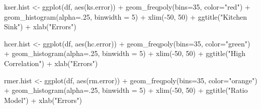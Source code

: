 \documentclass[
]{article}
\newenvironment{Shaded}{\begin{snugshade}}{\end{snugshade}}
\newcommand{\AttributeTok}[1]{\textcolor[rgb]{0.77,0.63,0.00}{#1}}
\newcommand{\DecValTok}[1]{\textcolor[rgb]{0.00,0.00,0.81}{#1}}
\newcommand{\FunctionTok}[1]{\textcolor[rgb]{0.00,0.00,0.00}{#1}}
\newcommand{\NormalTok}[1]{#1}
\newcommand{\OtherTok}[1]{\textcolor[rgb]{0.56,0.35,0.01}{#1}}
\newcommand{\SpecialCharTok}[1]{\textcolor[rgb]{0.00,0.00,0.00}{#1}}
\newcommand{\StringTok}[1]{\textcolor[rgb]{0.31,0.60,0.02}{#1}}
\begin{document}
\begin{Shaded}
\begin{Highlighting}[]
\NormalTok{kser.hist }\OtherTok{\textless{}{-}} \FunctionTok{ggplot}\NormalTok{(df, }\FunctionTok{aes}\NormalTok{(ks.error)) }\SpecialCharTok{+} 
  \FunctionTok{geom\_freqpoly}\NormalTok{(}\AttributeTok{bins=}\DecValTok{35}\NormalTok{, }\AttributeTok{color=}\StringTok{"red"}\NormalTok{) }\SpecialCharTok{+} 
  \FunctionTok{geom\_histogram}\NormalTok{(}\AttributeTok{alpha=}\NormalTok{.}\DecValTok{25}\NormalTok{, }\AttributeTok{binwidth =} \DecValTok{5}\NormalTok{)  }\SpecialCharTok{+} 
  \FunctionTok{xlim}\NormalTok{(}\SpecialCharTok{{-}}\DecValTok{50}\NormalTok{, }\DecValTok{50}\NormalTok{) }\SpecialCharTok{+} 
  \FunctionTok{ggtitle}\NormalTok{(}\StringTok{"Kitchen Sink"}\NormalTok{) }\SpecialCharTok{+} 
  \FunctionTok{xlab}\NormalTok{(}\StringTok{"Errors"}\NormalTok{)}

\NormalTok{hcer.hist }\OtherTok{\textless{}{-}} \FunctionTok{ggplot}\NormalTok{(df, }\FunctionTok{aes}\NormalTok{(hc.error)) }\SpecialCharTok{+} 
  \FunctionTok{geom\_freqpoly}\NormalTok{(}\AttributeTok{bins=}\DecValTok{35}\NormalTok{, }\AttributeTok{color=}\StringTok{"green"}\NormalTok{) }\SpecialCharTok{+} 
  \FunctionTok{geom\_histogram}\NormalTok{(}\AttributeTok{alpha=}\NormalTok{.}\DecValTok{25}\NormalTok{, }\AttributeTok{binwidth =} \DecValTok{5}\NormalTok{) }\SpecialCharTok{+} 
  \FunctionTok{xlim}\NormalTok{(}\SpecialCharTok{{-}}\DecValTok{50}\NormalTok{, }\DecValTok{50}\NormalTok{) }\SpecialCharTok{+} 
  \FunctionTok{ggtitle}\NormalTok{(}\StringTok{"High Correlation"}\NormalTok{) }\SpecialCharTok{+} 
  \FunctionTok{xlab}\NormalTok{(}\StringTok{"Errors"}\NormalTok{)}

\NormalTok{rmer.hist }\OtherTok{\textless{}{-}} \FunctionTok{ggplot}\NormalTok{(df, }\FunctionTok{aes}\NormalTok{(rm.error)) }\SpecialCharTok{+} 
  \FunctionTok{geom\_freqpoly}\NormalTok{(}\AttributeTok{bins=}\DecValTok{35}\NormalTok{, }\AttributeTok{color=}\StringTok{"orange"}\NormalTok{) }\SpecialCharTok{+} 
  \FunctionTok{geom\_histogram}\NormalTok{(}\AttributeTok{alpha=}\NormalTok{.}\DecValTok{25}\NormalTok{, }\AttributeTok{binwidth =} \DecValTok{5}\NormalTok{) }\SpecialCharTok{+} 
  \FunctionTok{xlim}\NormalTok{(}\SpecialCharTok{{-}}\DecValTok{50}\NormalTok{, }\DecValTok{50}\NormalTok{) }\SpecialCharTok{+} 
  \FunctionTok{ggtitle}\NormalTok{(}\StringTok{"Ratio Model"}\NormalTok{) }\SpecialCharTok{+} 
  \FunctionTok{xlab}\NormalTok{(}\StringTok{"Errors"}\NormalTok{)}


\end{Highlighting}
\end{Shaded}
\end{document}
